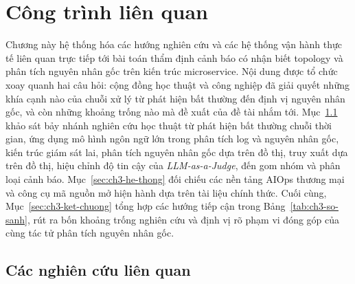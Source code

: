 %        
%        
%        
%        
%

\chapter{Công trình liên quan}
\label{ch:cong-trinh-lien-quan}

Chương này hệ thống hóa các hướng nghiên cứu và các hệ thống vận hành thực tế liên quan trực tiếp tới bài toán thẩm định cảnh báo có nhận biết topology và phân tích nguyên nhân gốc trên kiến trúc microservice. Nội dung được tổ chức xoay quanh hai câu hỏi: cộng đồng học thuật và công nghiệp đã giải quyết những khía cạnh nào của chuỗi xử lý từ phát hiện bất thường đến định vị nguyên nhân gốc, và còn những khoảng trống nào mà đề xuất của đề tài nhắm tới. Mục~\ref{sec:ch3-nghien-cuu} khảo sát bảy nhánh nghiên cứu học thuật từ phát hiện bất thường chuỗi thời gian, ứng dụng mô hình ngôn ngữ lớn trong phân tích log và nguyên nhân gốc, kiến trúc giám sát lai, phân tích nguyên nhân gốc dựa trên đồ thị, truy xuất dựa trên đồ thị, hiệu chỉnh độ tin cậy của \emph{LLM-as-a-Judge}, đến gom nhóm và phân loại cảnh báo. Mục~\ref{sec:ch3-he-thong} đối chiếu các nền tảng AIOps thương mại và công cụ mã nguồn mở hiện hành dựa trên tài liệu chính thức. Cuối cùng, Mục~\ref{sec:ch3-ket-chuong} tổng hợp các hướng tiếp cận trong Bảng~\ref{tab:ch3-so-sanh}, rút ra bốn khoảng trống nghiên cứu và định vị rõ phạm vi đóng góp của \CTAV{} cùng tác tử phân tích nguyên nhân gốc.

\section{Các nghiên cứu liên quan}
\label{sec:ch3-nghien-cuu}

